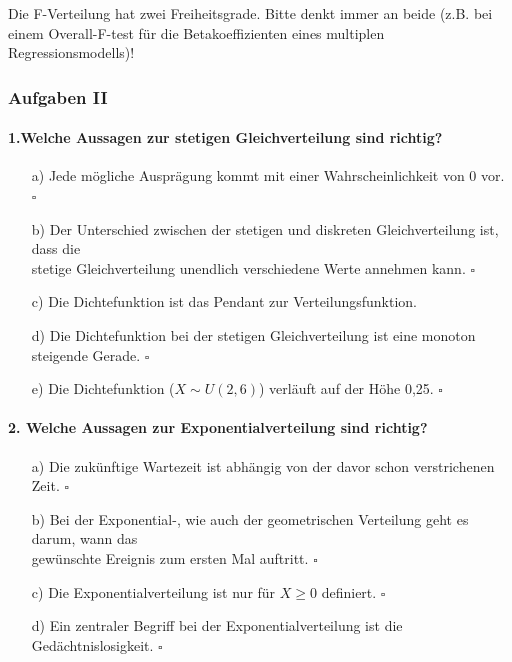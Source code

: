 \documentclass[a4paper]{article}
\newcommand\dangersign[1][2ex]{%
  \renewcommand\stacktype{L}%
  \scaleto{\stackon[1.3pt]{\color{red}$\triangle$}{\tiny !}}{#1}%
}
\begin{document}
\noindent \dangersign[3ex] Die F-Verteilung hat zwei Freiheitsgrade. Bitte denkt immer an beide (z.B. bei einem Overall-F-test für die Betakoeffizienten eines multiplen Regressionsmodells)!\\

\noindent {}

\clearpage

\subsubsection{Aufgaben II}
\paragraph{1.Welche Aussagen zur stetigen Gleichverteilung sind richtig?}
\begin{itemize}
    \item[a)] Jede mögliche Ausprägung kommt mit einer Wahrscheinlichkeit von 0 vor. \hfill $\square$
    \item[b)] Der Unterschied zwischen der stetigen und diskreten Gleichverteilung ist, dass die\\ stetige Gleichverteilung unendlich verschiedene Werte annehmen kann. \hfill $\square$
    \item[c)] Die Dichtefunktion ist das Pendant zur Verteilungsfunktion.
    \item[d)] Die Dichtefunktion bei der stetigen Gleichverteilung ist eine monoton steigende Gerade. \hfill $\square$
    \item[e)] Die Dichtefunktion ($X \sim U(2,6)$) verläuft auf der Höhe 0,25. \hfill $\square$
\end{itemize}

\paragraph{2. Welche Aussagen zur Exponentialverteilung sind richtig?}
\begin{itemize}
    \item[a)] Die zukünftige Wartezeit ist abhängig von der davor schon verstrichenen Zeit. \hfill $\square$
    \item[b)] Bei der Exponential-, wie auch der geometrischen Verteilung geht es darum, wann das\\ gewünschte Ereignis zum ersten Mal auftritt. \hfill $\square$
    \item[c)] Die Exponentialverteilung ist nur für $X \geq 0$ definiert. \hfill $\square$
    \item[d)] Ein zentraler Begriff bei der Exponentialverteilung ist die Gedächtnislosigkeit. \hfill $\square$
\end{itemize}
\end{document}
